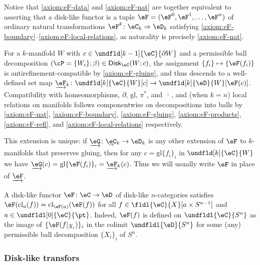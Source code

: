\documentclass[12pt,reqno]{amsart}
\newcommand{\glu}{\mathrm{gl}}
\newcommand{\cl}{\mathrm{cl}}
\newcommand{\Disk}{\mathsf{Disk}}
\newcommand{\C}{\eC}
\newcommand{\D}{\eD}
\newcommand{\fcj}[1]{\overline{#1}}
\newcommand{\undCtemp}{\bgroup\smash[b]{\text{$\underset{\smash{\raisebox{.225em}{$\scriptstyle\kern.05ex\rightarrow$}}}{\smash{\C}}$}}\egroup}
\newcommand{\undC}{\vphantom{\C}{\undCtemp}}
\newcommand{\undD}{\D}
\begin{document}
Notice that \ref{axiom:eF-data} and \ref{axiom:eF-nat} are together equivalent to asserting that a disk-like functor is a tuple $\eF=(\eF^0,\eF^1,\dots,\eF^n)$ of ordinary natural transformations $\eF^k\colon\C_k\Rightarrow\D_k$ satisfying \ref{axiom:eF-boundary}--\ref{axiom:eF-local-relations}, as naturality is precisely \ref{axiom:eF-nat}.

\begin{remark}
\label{prop:functor-extension}
For a $k$-manifold $W$ with $c\in\undfld[k-1]{\C}{\partial W}$ and a permissible ball decomposition $(\cP=\{W_i\};\beta)\in\Disk_\C(W;c)$, the assignment $\{f_i\}\mapsto\{\eF(f_i)\}$ is antirefinement-compatible by \ref{axiom:eF-gluing}, and thus descends to a well-defined set map $\underrightarrow{\eF}_k\colon\undfld[k]{\C}{W}[c]\to\undfld[k]{\D}{W}[\eF(c)]$. Compatibility with homeomorphisms, $\partial$, $\glu$, $\pi^*$, and $\fcj{\,\cdot\,}$, and (when $k=n$) local relations on manifolds follows componentwise on decompositions into balls by \ref{axiom:eF-nat}, \ref{axiom:eF-boundary}, \ref{axiom:eF-gluing}, \ref{axiom:eF-products}, \ref{axiom:eF-refl}, and \ref{axiom:eF-local-relations} respectively.

This extension is unique: if $\underrightarrow{\eG}\colon\undC_k\to\undD_k$ is any other extension of $\eF$ to $k$-manifolds that preserves gluing, then for any $c=\glu\{ f_i\}_i$ in $\undfld[k]{\C}{W}$ we have $\underrightarrow{\eG}(c)=\glu\{\eF(f_i)\}_i=\underrightarrow{\eF}_k(c)$. Thus we will usually write $\eF$ in place of $\underrightarrow{\eF}$. 
\end{remark}


\begin{example}
\label{example:functors-preserve-closure}
  A disk-like functor $\eF \colon \C \to \D$ of disk-like $n$-categories satisfies $\eF(\cl_a(f)) = \cl_{\eF(a)}(\eF(f))$ for all $f \in \fldl{\C}{X}[ a\times S^{n-1}]$ and $a \in \undfldl[0]{\C}{\pt}$.
  Indeed, $\eF(f)$ is defined on $\undfldl{\C}{S^n}$ as the image of $\{ \eF(f|_{X_i})\}_i$ in the
  colimit $\undfldl{\D}{S^n}$ for some (any) permissible ball decomposition $\{X_i\}_i$ of $S^n$.
\end{example}


\subsubsection{Disk-like transfors}

\
\end{document}

